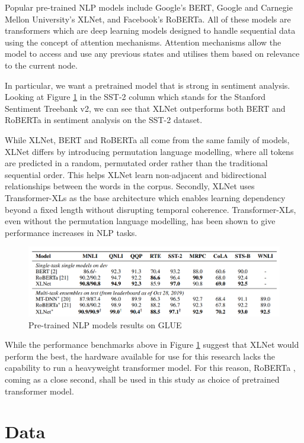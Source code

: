 \documentclass[12pt, a4paper]{article}
\begin{document}
Popular pre-trained NLP models include Google's BERT, Google and Carnegie Mellon University's XLNet, and Facebook's RoBERTa. All of these models are transformers which are deep learning models designed to handle sequential data using the concept of attention mechanisms. Attention mechanisms allow the model to access and use any previous states and utilises them based on relevance to the current node. \cite{vaswani2017attention} 

In particular, we want a pretrained model that is strong in sentiment analysis. Looking at Figure \ref{benchmarks} in the SST-2 column which stands for the Stanford Sentiment Treebank v2, we can see that XLNet \cite{yang2020xlnet} outperforms both BERT and RoBERTa in sentiment analysis on the SST-2 dataset.

While XLNet, BERT and RoBERTa all come from the same family of models, XLNet differs by introducing permutation language modelling, where all tokens are predicted in a random, permutated order rather than the traditional sequential order. This helps XLNet learn non-adjacent and bidirectional relationships between the words in the corpus. Secondly, XLNet uses Transformer-XLs as the base architecture which enables learning dependency beyond a fixed length without disrupting temporal coherence. \cite{dai2019transformerxl} Transformer-XLs, even without the permutation language modelling, has been shown to give performance increases in NLP tasks. 

\begin{figure}
	\includegraphics[scale=0.45]{benchmarks}
	\caption{Pre-trained NLP models results on GLUE}
	\label{benchmarks}
\end{figure}

While the performance benchmarks above in Figure \ref{benchmarks} suggest that XLNet would perform the best, the hardware available for use for this research lacks the capability to run a heavyweight transformer model. For this reason, RoBERTa \cite{roberta}, coming as a close second, shall be used in this study as choice of pretrained transformer model.

\section{Data}
\end{document}
